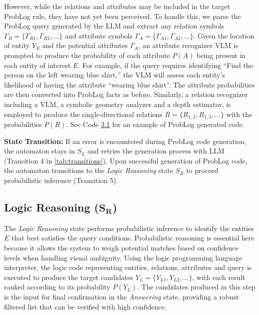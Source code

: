 However, while the relations and attributes may be included in the target ProbLog rule, they have not yet been perceived. To handle this, we parse the ProbLog query generated by the LLM and extract any relation symbols $\Gamma_R=\{\Gamma_{R1}, \Gamma_{R2}, ...\}$ and attribute symbols $\Gamma_A = \{\Gamma_{A1}, \Gamma_{A2}, ...\}$. Given the location of entity $Y_E$ and the potential attributes $\Gamma_A$, an attribute recognizer VLM is prompted to produce the probability of each attribute $P(A)$ being present in each entity of interest $E$. For example, if the query requires identifying ``Find the person on the left wearing blue shirt,'' the VLM will assess each entity's likelihood of having the attribute ``wearing blue shirt''. The attribute probabilities are then converted into ProbLog facts as before. Similarly, a relation recognizer including a VLM, a symbolic geometry analyzer and a depth estimator, is employed to produce the single-directional relations $R = \{R_{1,2}, R_{1,3}, ...\}$ with the probabilities $P(R)$. See Code \hyperref[code:problog]{3.1} for an example of ProbLog generated code.%

\textbf{State Transition:} If an error is encountered during ProbLog code generation, the automaton stays in $S_L$ and retries the generation process with LLM (Transition 4 in \autoref{tab:transitions}). Upon successful generation of ProbLog code, the automaton transitions to the \emph{Logic Reasoning} state $S_R$ to proceed probabilistic inference (Transition 5).

\subsection{Logic Reasoning (\texorpdfstring{$\boldsymbol{S_R}$}{S\_R})}
\label{sec:logic_reasoning}

The \emph{Logic Reasoning} state performs probabilistic inference to identify the entities $E$ that best satisfies the query conditions. Probabilistic reasoning is essential here because it allows the system to weigh potential matches based on confidence levels when handling visual ambiguity. Using the logic programming language interpreter, the logic code representing entities, relations, attributes and query is executed to produce the target candidates $Y_L = \{Y_{L1}, Y_{L2}, ...\}$, with each result ranked according to its probability $P(Y_L)$. 
The candidates produced in this step is the input for final confirmation in the \emph{Answering} state, providing a robust filtered list that can be verified with high confidence.

